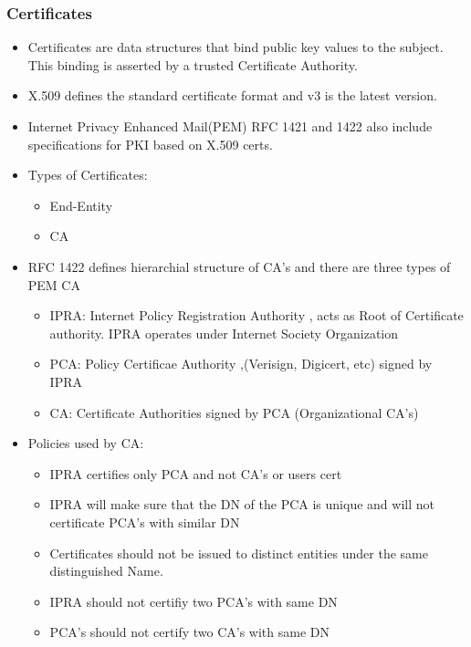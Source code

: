 \documentclass[a4paper]{article}
\begin{document}
    \subsubsection {Certificates}
        \begin{itemize}
            \item Certificates are data structures that bind public key values to the subject. This binding is asserted by a trusted Certificate Authority.
            \item X.509 defines the standard certificate format and v3 is the latest version.
            \item Internet Privacy Enhanced Mail(PEM) RFC 1421 and 1422 also include specifications for PKI based on X.509 certs. 
            \item Types of Certificates:
                \begin{itemize}
                    \item End-Entity
                    \item CA
                \end{itemize}
            \item RFC 1422 defines hierarchial structure  of CA's and there are three types of PEM CA
                \begin{itemize}
                    \item IPRA: Internet Policy Registration Authority , acts as Root of Certificate authority. IPRA operates under Internet Society Organization
                    \item PCA: Policy Certificae Authority ,(Verisign, Digicert, etc) signed by IPRA
                    \item CA: Certificate Authorities signed by PCA (Organizational CA's)
                \end{itemize}
            \item Policies used by CA:
                \begin{itemize}
                    \item IPRA certifies only PCA and not CA's or users cert
                    \item IPRA will make sure that the DN of the PCA is unique and will not certificate PCA's with similar DN
                    \item Certificates should not be issued to distinct entities under the same distinguished Name. 
                    \item IPRA should not certifiy two PCA's with same DN
                    \item PCA's should not certify two CA's with same DN

\end{itemize}
\end{itemize}
\end{document}
